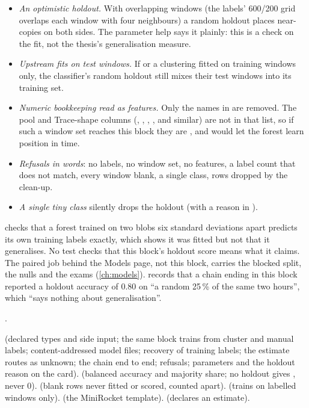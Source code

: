 \begin{itemize}
\item \emph{An optimistic holdout.} With overlapping windows (the labels' 600/200 grid
  overlaps each window with four neighbours) a random holdout places near-copies on both
  sides. The parameter help says it plainly: this is a check on the fit, not the thesis's
  generalisation measure.
\item \emph{Upstream fits on test windows.} If  or a clustering
  fitted on training windows only, the classifier's random holdout still mixes their test
  windows into its training set.
\item \emph{Numeric bookkeeping read as features.} Only the names in
   are removed. The pool and Trace-shape columns
  (, , , , and
  similar) are not in that list, so if such a window set reaches this block they are
  , and  would let the forest learn position in
  time.
\item \emph{Refusals in words}: no labels, no window set, no features, a label count that
  does not match, every window blank, a single class, rows dropped by the clean-up.
\item \emph{A single tiny class} silently drops the holdout (with a reason in
  ).
\end{itemize}

 checks that a forest trained on two blobs six standard
deviations apart predicts its own training labels exactly, which shows it was fitted but not
that it generalises. No test checks that this block's holdout score means what it claims.
The paired job behind the Models page, not this block, carries the blocked split, the nulls
and the exams (\cref{ch:models}). 
records that a chain ending in this block reported a holdout accuracy of 0.80 on ``a random
25\,\% of the same two hours'', which ``says nothing about generalisation''.

\citet{breiman2001random}.

 (declared types and side input; the same block trains from
cluster and manual labels; content-addressed model files; recovery of training labels; the
estimate routes as unknown; the chain end to end; refusals; parameters and the holdout reason
on the card).  (balanced accuracy and majority
share; no holdout gives , never 0). 
(blank rows never fitted or scored, counted apart). 
(trains on labelled windows only). 
(the MiniRocket template).  (declares an estimate).
